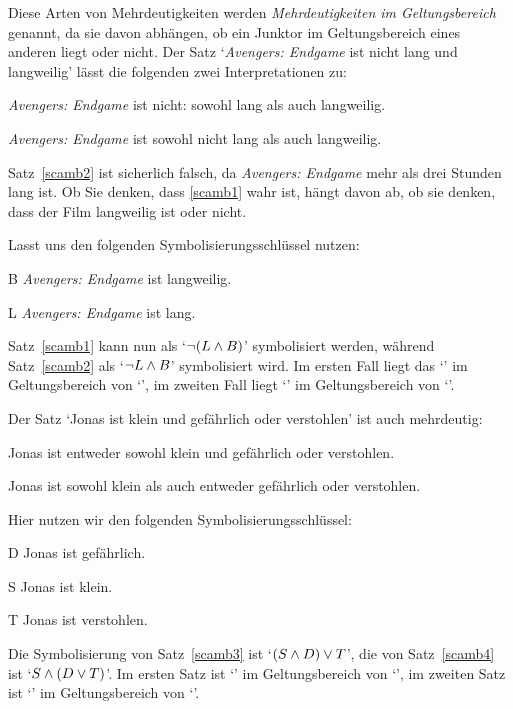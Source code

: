 Diese Arten von Mehrdeutigkeiten werden \emph{Mehrdeutigkeiten im Geltungsbereich} genannt, da sie davon abhängen, ob ein Junktor im Geltungsbereich eines anderen liegt oder nicht. Der Satz `\emph{Avengers: Endgame} ist nicht lang und langweilig' lässt die folgenden zwei Interpretationen zu:
\begin{earg}
	\item[\ex{scamb1}] \emph{Avengers: Endgame} ist nicht: sowohl lang als auch langweilig.
	\item[\ex{scamb2}] \emph{Avengers: Endgame} ist sowohl nicht lang als auch langweilig.
\end{earg}
Satz~\ref{scamb2} ist sicherlich falsch, da \emph{Avengers: Endgame} mehr als drei Stunden lang ist. Ob Sie denken, dass \ref{scamb1} wahr ist, hängt davon ab, ob sie denken, dass der Film langweilig ist oder nicht. 

Lasst uns den folgenden Symbolisierungsschlüssel nutzen:
\begin{ekey}
	\item[B] \emph{Avengers: Endgame} ist langweilig.
	\item[L] \emph{Avengers: Endgame} ist lang.
\end{ekey}
Satz~\ref{scamb1} kann nun als `$\neg(L \wedge B)$' symbolisiert werden, während Satz~\ref{scamb2} als `$\neg L \wedge B$' symbolisiert wird. Im ersten Fall liegt das `\eand' im Geltungsbereich von `\enot', im zweiten Fall liegt `\enot' im Geltungsbereich von `\eand'.

Der Satz `Jonas ist klein und gefährlich oder verstohlen' ist auch mehrdeutig:
\begin{earg}
	\item[\ex{scamb3}] Jonas ist entweder sowohl klein und gefährlich oder verstohlen.
	\item[\ex{scamb4}] Jonas ist sowohl klein als auch entweder gefährlich oder verstohlen.
\end{earg}
Hier nutzen wir den folgenden Symbolisierungsschlüssel:
\begin{ekey}
	\item[D] Jonas ist gefährlich.
	\item[S] Jonas ist klein.
	\item[T] Jonas ist verstohlen. 
\end{ekey}
Die Symbolisierung von Satz~\ref{scamb3} ist `$(S \wedge D) \vee T$', die von Satz~\ref{scamb4} ist `$S \wedge (D \vee T)$'. Im ersten Satz ist `\eand' im Geltungsbereich von `\eor', im zweiten Satz ist `\eor' im Geltungsbereich von `\eand'.


